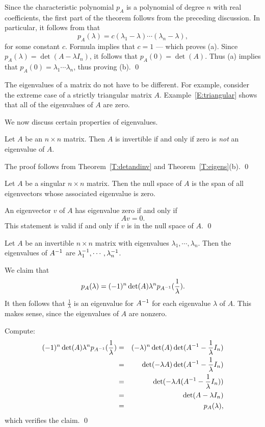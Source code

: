 \documentclass{ximera}
\begin{document}
\proof Since the characteristic polynomial $p_A$ is a polynomial
of degree $n$ with real coefficients, the first part of the
theorem follows from the preceding discussion. In particular, it follows
from  that 
\[
p_A(\lambda) = c(\lambda_1-\lambda)\cdots(\lambda_n-\lambda),
\]
for some constant $c$.  Formula  implies that
$c=1$ --- which proves (a).  Since $p_A(\lambda)=\det(A-\lambda I_n)$, 
it follows that $p_A(0)=\det(A)$.  Thus (a) implies 
that $p_A(0)=\lambda_1\cdots\lambda_n$, thus proving (b).  \qed

The eigenvalues of a matrix do not have to be different.  For
example, consider the extreme case of a strictly triangular
matrix $A$.  Example~\ref{E:triangular} shows that all of the
eigenvalues of $A$ are zero. 

We now discuss certain properties of eigenvalues.  
\begin{cor}  \label{C:eig=0}
Let $A$ be an $n\times n$ matrix. Then $A$ is invertible if and
only if zero is {\em not\/} an eigenvalue of $A$.
\end{cor}  

\proof The proof follows from Theorem~\ref{T:detandinv} and
Theorem~\ref{T:eigens}(b). \qed 

\begin{lemma} 
Let $A$ be a singular $n\times n$ matrix.  Then the null space of $A$
is the span of all eigenvectors whose associated eigenvalue is zero.
\end{lemma} 

\proof An eigenvector $v$ of $A$ has eigenvalue zero if and only
if 
\[
Av=0.
\]
This statement is valid if and only if $v$ is in the null space
of $A$. \qed



\begin{thm}  \label{T:inveig}
Let $A$ be an invertible $n\times n$ matrix with eigenvalues 
$\lambda_1,\cdots,\lambda_n$.  Then the eigenvalues of 
$A^{-1}$ are $\lambda_1^{-1},\cdots,\lambda_n^{-1}$.
\end{thm}  

\proof  We claim that  
\[
p_A(\lambda) = (-1)^n \det(A) \lambda^n p_{A^{-1}}(\frac{1}{\lambda}).
\]
It then follows that $\frac{1}{\lambda}$ is an eigenvalue for
$A^{-1}$ for each eigenvalue $\lambda$ of $A$.  This makes sense,
since the eigenvalues of $A$ are nonzero. 

Compute:
\begin{eqnarray*}
(-1)^n \det(A) \lambda^n p_{A^{-1}}(\frac{1}{\lambda}) & = &
 (-\lambda)^n \det(A)\det(A^{-1}-\frac{1}{\lambda}I_n) \\
& = & \det(-\lambda A)\det(A^{-1}-\frac{1}{\lambda}I_n)\\
& = & \det(-\lambda A (A^{-1}-\frac{1}{\lambda}I_n))\\
& = & \det(A-\lambda I_n) \\
& = & p_A(\lambda),
\end{eqnarray*}
which verifies the claim.  \qed
\end{document}
